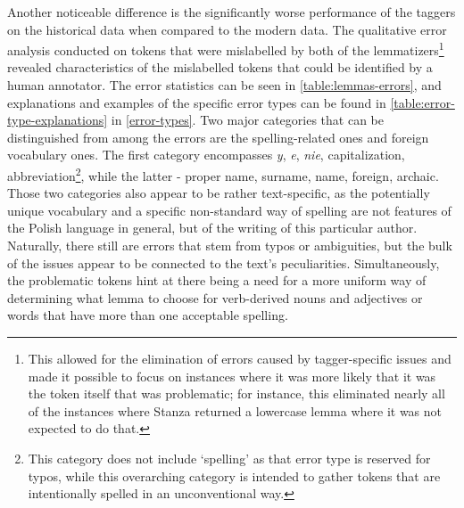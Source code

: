 Another noticeable difference is the significantly worse performance of the taggers on the historical data when compared to the modern data. The qualitative error analysis conducted on tokens that were mislabelled by both of the lemmatizers\footnote{This allowed for the elimination of errors caused by tagger-specific issues and made it possible to focus on instances where it was more likely that it was the token itself that was problematic; for instance, this eliminated nearly all of the instances where Stanza returned a lowercase lemma where it was not expected to do that.} revealed characteristics of the mislabelled tokens that could be identified by a human annotator. The error statistics can be seen in \autoref{table:lemmas-errors}, and explanations and examples of the specific error types can be found in \autoref{table:error-type-explanations} in \autoref{error-types}. Two major categories that can be distinguished from among the errors are the spelling-related ones and foreign vocabulary ones. The first category encompasses \textit{y}, \textit{e}, \textit{nie}, capitalization, abbreviation\footnote{This category does not include `spelling' as that error type is reserved for typos, while this overarching category is intended to gather tokens that are intentionally spelled in an unconventional way.}, while the latter - proper name, surname, name, foreign, archaic. Those two categories also appear to be rather text-specific, as the potentially unique vocabulary and a specific non-standard way of spelling are not features of the Polish language in general, but of the writing of this particular author. Naturally, there still are errors that stem from typos or ambiguities, but the bulk of the issues appear to be connected to the text's peculiarities. Simultaneously, the problematic tokens hint at there being a need for a more uniform way of determining what lemma to choose for verb-derived nouns and adjectives or words that have more than one acceptable spelling.

